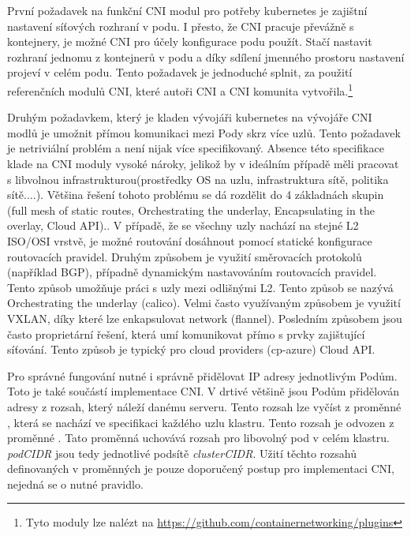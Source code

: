 První požadavek na funkční CNI modul pro potřeby kubernetes je zajištní nastavení síťových rozhraní v podu. I přesto, že CNI pracuje převážně s kontejnery, je možné CNI pro účely konfigurace podu použít. Stačí nastavit rozhraní jednomu z kontejnerů v podu a díky sdílení jmenného prostoru nastavení projeví v celém podu. Tento požadavek je jednoduché splnit, za použití referenčních modulů CNI, které autoři CNI a CNI komunita vytvořila.\footnote{Tyto moduly lze nalézt na \href{https://github.com/containernetworking/plugins}{https://github.com/containernetworking/plugins}}

Druhým požadavkem, který je kladen vývojáři kubernetes na vývojáře CNI modlů je umožnit přímou komunikaci mezi Pody skrz více uzlů. Tento požadavek je netriviální problém a není nijak více specifikovaný. Absence této specifikace klade na CNI moduly vysoké nároky, jelikož by v ideálním případě měli pracovat s libvolnou infrastrukturou(prostředky OS na uzlu, infrastruktura sítě, politika sítě....). Většina řešení tohoto problému se dá rozdělit do 4 základnách skupin (full mesh of static routes, Orchestrating the underlay, Encapsulating in the overlay, Cloud API).\cite{kashin_2022_cni}\cite{callendrello_2019_kubernetes}. V případě, že se všechny uzly nachází na stejné L2 ISO/OSI vrstvě, je možné routování dosáhnout pomocí statické konfigurace routovacích pravidel. Druhým způsobem je využití směrovacích protokolů (například BGP), případně dynamickým nastavováním routovacích pravidel. Tento způsob umožňuje práci s uzly mezi odlišnými L2. Tento způsob se nazývá Orchestrating the underlay (calico). Velmi často využívaným způsobem je využití VXLAN, díky které lze enkapsulovat network (flannel). Posledním způsobem jsou často proprietární řešení, která umí komunikovat přímo s prvky zajištující síťování. Tento způsob je typický pro cloud providers (cp-azure) Cloud API.

Pro správné fungování nutné i správně přidělovat IP adresy jednotlivým Podům. Toto je také součástí implementace CNI. V drtivé většině jsou Podům přidělován adresy z rozsah, který náleží danému serveru. Tento rozsah lze vyčíst z proměnné , která se nachází ve specifikaci každého uzlu klastru. Tento rozsah je odvozen z proměnné . Tato proměnná uchovává rozsah pro libovolný pod v celém klastru. \textit{podCIDR} jsou tedy jednotlivé podsítě \textit{clusterCIDR}. Užití těchto rozsahů definovaných v proměnných je pouze doporučený postup pro implementaci CNI, nejedná se o nutné pravidlo.\cite{callendrello_2019_kubernetes}       

